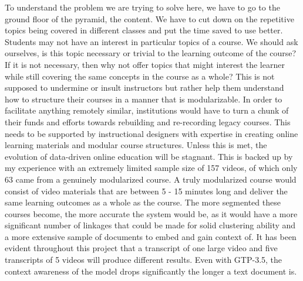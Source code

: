 To understand the problem we are trying to solve here, we have to go to the ground floor of the pyramid, the content. We have to cut down on the repetitive topics being covered in different classes and put the time saved to use better. Students may not have an interest in particular topics of a course. We should ask ourselves, is this topic necessary or trivial to the learning outcome of the course? If it is not necessary, then why not offer topics that might interest the learner while still covering the same concepts in the course as a whole? This is not supposed to undermine or insult instructors but rather help them understand how to structure their courses in a manner that is modularizable. In order to facilitate anything remotely similar, institutions would have to turn a chunk of their funds and efforts towards rebuilding and re-recording legacy courses. This needs to be supported by instructional designers with expertise in creating online learning materials and modular course structures. Unless this is met, the evolution of data-driven online education will be stagnant. This is backed up by my experience with an extremely limited sample size of 157 videos, of which only 63 came from a genuinely modularized course. A truly modularized course would consist of video materials that are between 5 - 15 minutes long and deliver the same learning outcomes as a whole as the course. The more segmented these courses become, the more accurate the system would be, as it would have a more significant number of linkages that could be made for solid clustering ability and a more extensive sample of documents to embed and gain context of. It has been evident throughout this project that a transcript of one large video and five transcripts of 5 videos will produce different results. Even with GTP-3.5, the context awareness of the model drops significantly the longer a text document is.